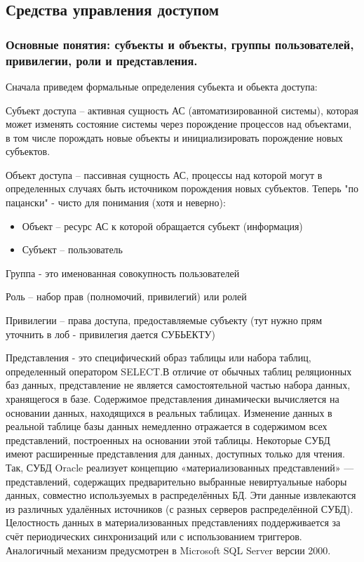 \subsection{Средства управления доступом}
\subsubsection{Основные понятия: субъекты и объекты, группы пользователей, привилегии, роли и представления.}
Сначала приведем формальные определения субьекта и обьекта доступа:

Субъект доступа – активная сущность АС (автоматизированной системы), которая может изменять состояние системы через порождение процессов над объектами, в том числе порождать новые объекты и инициализировать порождение новых субъектов.

Объект доступа – пассивная сущность АС, процессы над которой могут в определенных случаях быть источником порождения новых субъектов.
Теперь "по пацански" - чисто для понимания (хотя и неверно):
\begin{itemize}
    \item Объект – ресурс АС к которой обращается субьект (информация)
    \item Субъект – пользователь
\end{itemize}

Группа - это именованная совокупность пользователей

Роль – набор прав (полномочий, привилегий) или ролей

Привилегии – права доступа, предоставляемые субъекту (тут нужно прям уточнить в лоб - привилегия дается СУБЬЕКТУ)

Представления - это специфический образ таблицы или набора таблиц,
определенный оператором SELECT.В отличие от обычных таблиц реляционных баз данных, представление не является самостоятельной частью набора данных, хранящегося в базе. Содержимое представления динамически вычисляется на основании данных, находящихся в реальных таблицах. Изменение данных в реальной таблице базы данных немедленно отражается в содержимом всех представлений, построенных на основании этой таблицы. Некоторые СУБД имеют расширенные представления для данных, доступных только для чтения. Так, СУБД Oracle реализует концепцию «материализованных представлений» — представлений, содержащих предварительно выбранные невиртуальные наборы данных, совместно используемых в распределённых БД. Эти данные извлекаются из различных удалённых источников (с разных серверов распределённой СУБД). Целостность данных в материализованных представлениях поддерживается за счёт периодических синхронизаций или с использованием триггеров. Аналогичный механизм предусмотрен в Microsoft SQL Server версии 2000.

